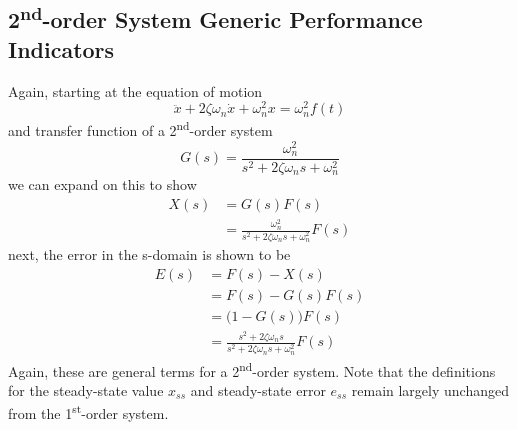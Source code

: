\documentclass[12pt,letter]{article}
\begin{document}
\subsection{2\textsuperscript{nd}-order System Generic Performance Indicators}

%



Again, starting at the equation of motion
\begin{equation}
\ddot{x} + 2 \zeta \omega_n \dot{x} + \omega_n^2 x = \omega_n^2 f(t)
\end{equation}
and transfer function of a 2\textsuperscript{nd}-order system
\begin{equation}
G(s) = \frac{\omega_n^2}{s^2 + 2 \zeta \omega_n s + \omega_n^2}
\end{equation}
we can expand on this to show
\begin{align}
X(s) &= G(s)F(s) \\
&=  \frac{\omega_n^2}{s^2 + 2 \zeta \omega_n s + \omega_n^2} F(s) \nonumber
\end{align}
next, the error in the s-domain is shown to be
\begin{align}
E(s) &= F(s) - X(s) \\
&= F(s) - G(s)F(s) \nonumber \\ 
&= \big( 1-G(s) \big) F(s) \nonumber \\  
&= \frac{s^2 + 2 \zeta \omega_n s}{s^2 + 2 \zeta \omega_n s + \omega_n^2} F(s) \nonumber
\end{align}
Again, these are general terms for a 2\textsuperscript{nd}-order system. Note that the definitions for the steady-state value $x_{ss}$ and steady-state error $e_{ss}$ remain largely unchanged from the 1\textsuperscript{st}-order system.
\end{document}

